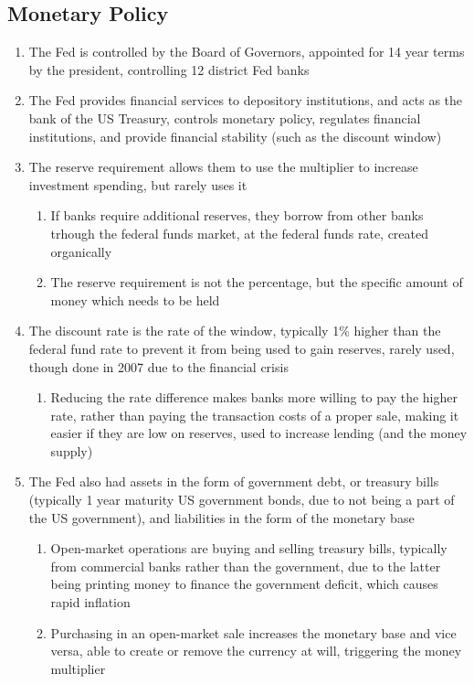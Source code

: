 \documentclass[11 pt, twoside]{article}
\begin{document}
\subsection{Monetary Policy}
\begin{enumerate}
\item The Fed is controlled by the Board of Governors, appointed for 14 year terms by the president, controlling 12 district Fed banks
\item The Fed provides financial services to depository institutions, and acts as the bank of the US Treasury, controls monetary policy, regulates financial institutions, and provide financial stability (such as the discount window)
\item The reserve requirement allows them to use the multiplier to increase investment spending, but rarely uses it
\begin{enumerate}
\item If banks require additional reserves, they borrow from other banks trhough the federal funds market, at the federal funds rate, created organically
\item The reserve requirement is not the percentage, but the specific amount of money which needs to be held
\end{enumerate}
\item The discount rate is the rate of the window, typically 1\% higher than the federal fund rate to prevent it from being used to gain reserves, rarely used, though done in 2007 due to the financial crisis
\begin{enumerate}
\item Reducing the rate difference makes banks more willing to pay the higher rate, rather than paying the transaction costs of a proper sale, making it easier if they are low on reserves, used to increase lending (and the money supply)
\end{enumerate}
\item The Fed also had assets in the form of government debt, or treasury bills (typically 1 year maturity US government bonds, due to not being a part of the US government), and liabilities in the form of the monetary base
\begin{enumerate}
\item Open-market operations are buying and selling treasury bills, typically from commercial banks rather than the government, due to the latter being printing money to finance the government deficit, which causes rapid inflation
\item Purchasing in an open-market sale increases the monetary base and vice versa, able to create or remove the currency at will, triggering the money multiplier
\end{enumerate}
\end{enumerate}
\end{document}
